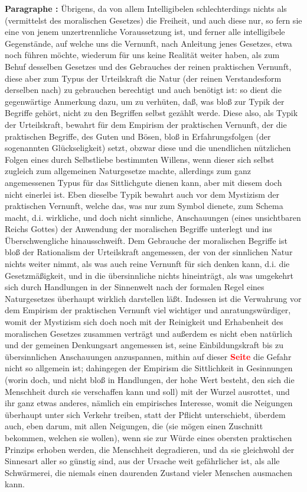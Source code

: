 \documentclass[a4paper,12pt,twoside]{book}
\newcommand{\match}[1]{\textcolor{red}{\textbf{#1}}}
\begin{document}
	\noindent\textbf{Paragraphe : }Übrigens, da von allem Intelligibelen schlechterdings nichts als (vermittelst des moralischen Gesetzes) die Freiheit, und auch diese nur, so fern sie eine von jenem unzertrennliche Voraussetzung ist, und ferner alle intelligibele Gegenstände, auf welche uns die Vernunft, nach Anleitung  jenes Gesetzes, etwa noch führen möchte, wiederum für uns keine Realität weiter haben, als zum Behuf desselben Gesetzes und des Gebrauches der reinen praktischen Vernunft, diese aber zum Typus der Urteilskraft die Natur (der reinen Verstandesform derselben nach) zu gebrauchen berechtigt und auch benötigt ist: so dient die gegenwärtige Anmerkung dazu, um zu verhüten, daß, was bloß zur Typik der Begriffe gehört, nicht zu den Begriffen selbst gezählt werde. Diese also, als Typik der Urteilskraft, bewahrt für dem Empirism der praktischen Vernunft, der die praktischen Begriffe, des Guten und Bösen, bloß in Erfahrungsfolgen (der sogenannten Glückseligkeit) setzt, obzwar diese und die unendlichen nützlichen Folgen eines durch Selbstliebe bestimmten Willens, wenn dieser sich selbst zugleich zum allgemeinen Naturgesetze machte, allerdings zum ganz angemessenen Typus für das Sittlichgute dienen kann, aber mit diesem doch nicht einerlei ist. Eben dieselbe Typik bewahrt auch vor dem Mystizism der praktischen Vernunft, welche das, was nur zum Symbol dienete, zum Schema macht, d.i. wirkliche, und doch nicht sinnliche, Anschauungen (eines unsichtbaren Reichs Gottes) der Anwendung der moralischen Begriffe unterlegt und ins Überschwengliche hinausschweift. Dem Gebrauche der moralischen Begriffe ist bloß der Rationalism der Urteilskraft angemessen, der von der sinnlichen Natur nichts weiter nimmt, als was auch reine Vernunft für sich denken kann, d.i. die Gesetzmäßigkeit, und in die übersinnliche nichts hineinträgt, als was umgekehrt sich durch Handlungen in der Sinnenwelt nach der formalen Regel eines Naturgesetzes überhaupt wirklich darstellen läßt. Indessen ist die Verwahrung vor dem Empirism der praktischen Vernunft viel wichtiger und anratungswürdiger, womit der Mystizism sich doch noch mit der Reinigkeit und Erhabenheit des moralischen Gesetzes zusammen verträgt und außerdem es nicht eben natürlich und der gemeinen Denkungsart angemessen ist, seine Einbildungskraft bis zu übersinnlichen Anschauungen anzuspannen, mithin auf dieser \match{Seite} die Gefahr nicht so allgemein  ist; dahingegen der Empirism die Sittlichkeit in Gesinnungen (worin doch, und nicht bloß in Handlungen, der hohe Wert besteht, den sich die Menschheit durch sie verschaffen kann und soll) mit der Wurzel ausrottet, und ihr ganz etwas anderes, nämlich ein empirisches Interesse, womit die Neigungen überhaupt unter sich Verkehr treiben, statt der Pflicht unterschiebt, überdem auch, eben darum, mit allen Neigungen, die (sie mögen einen Zuschnitt bekommen, welchen sie wollen), wenn sie zur Würde eines obersten praktischen Prinzips erhoben werden, die Menschheit degradieren, und da sie gleichwohl der Sinnesart aller so günstig sind, aus der Ursache weit gefährlicher ist, als alle Schwärmerei, die niemals einen daurenden Zustand vieler Menschen ausmachen kann. 
	
\end{document}
